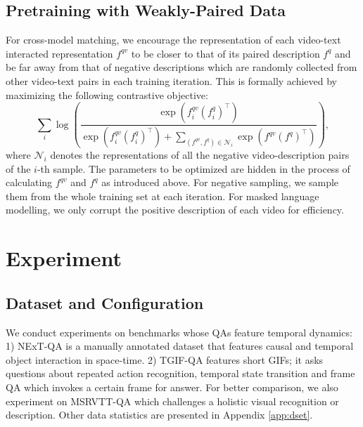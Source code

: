 \documentclass[runningheads]{llncs}
\begin{document}
\subsection{Pretraining with Weakly-Paired Data}
\label{sec:pt}
For cross-model matching, we encourage the representation of each video-text interacted representation $f^{qv}$ to be closer to that of its paired description $f^q$ and be far away from that of negative descriptions which are randomly collected from other video-text pairs in each training iteration. This is formally achieved by maximizing the following contrastive objective:
\begin{equation}
    \sum\limits_i \log(\frac{\exp{(f^{qv}_i(f^q_i)^{\top})}}{\exp{(f^{qv}_i(f^q_i)^{\top})}+\sum\nolimits_{(f^{qv}, f^q)\in \mathcal{N}_i} \exp{(f^{qv}(f^q)^{\top})} }),
\end{equation}
where $\mathcal{N}_i$ denotes the representations of all the negative video-description pairs of the $i$-th sample. The parameters to be optimized are hidden in the process of calculating $f^{qv}$ and $f^q$ as introduced above. For negative sampling, we sample them from the whole training set at each iteration. For masked language modelling, we only corrupt the positive description of each video for efficiency.

\section{Experiment}
\subsection{Dataset and Configuration}
We conduct experiments on benchmarks whose QAs feature temporal dynamics: 1) NExT-QA \cite{xiao2021next} is a manually annotated dataset that features causal and temporal object interaction in space-time. 2) TGIF-QA \cite{jang2017tgif} features short GIFs; it asks questions about repeated action recognition, temporal state transition and frame QA which invokes a certain frame for answer. For better comparison, we also experiment on MSRVTT-QA \cite{xu2017video} which challenges a holistic visual recognition or description. Other data statistics are presented in Appendix \ref{app:dset}.
\end{document}
